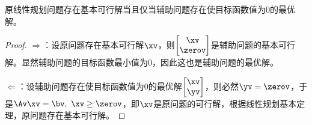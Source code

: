 \documentclass{ctexart}
\begin{document}
\begin{theorem}
    原线性规划问题存在基本可行解当且仅当辅助问题存在使目标函数值为$0$的最优解。
\end{theorem}

\begin{proof}
    $\Rightarrow$：设原问题存在基本可行解$\xv$，则$\begin{bmatrix}
            \xv \\ \zerov
        \end{bmatrix}$是辅助问题的基本可行解。显然辅助问题的目标函数最小值为$0$，因此这也是辅助问题的最优解。

    $\Leftarrow$：设辅助问题存在使目标函数值为$0$的最优解$\begin{bmatrix}
            \xv \\ \yv
        \end{bmatrix}$，则必然$\yv = \zerov$，于是$\Av \xv = \bv, ~ \xv \ge \zerov$，即$\xv$是原问题的可行解，根据线性规划基本定理，原问题存在基本可行解。
\end{proof}
\end{document}
